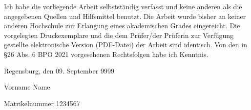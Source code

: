 \documentclass[11pt,a4paper,german,notitlepage]{report}
\newcommand{\authorname}{Vorname Name}
\newcommand{\matrikelnr}{1234567}
\newcommand{\abgabedatum}{09. September 9999}
\begin{document}
\vspace*{65pt}

Ich habe die vorliegende Arbeit selbstständig verfasst und keine anderen als die angegebenen Quellen und Hilfsmittel benutzt. Die Arbeit wurde bisher an keiner anderen Hochschule zur Erlangung eines akademischen Grades eingereicht. Die vorgelegten Druckexemplare und die dem Prüfer/der Prüferin zur Verfügung gestellte elektronische Version (PDF-Datei) der Arbeit sind identisch. Von den in §26 Abs. 6 BPO 2021 vorgesehenen Rechtsfolgen habe ich Kenntnis.


\vspace*{65pt}

Regensburg, den \abgabedatum

\vspace*{60pt}


\authorname

Matrikelnummer \matrikelnr
\end{document}
